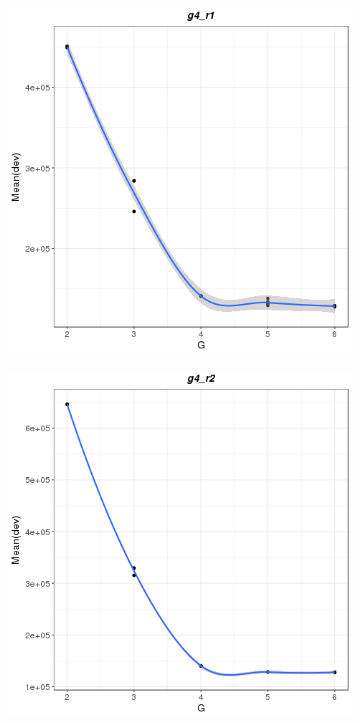 \documentclass{spbau-diploma}
\begin{document}
\begin{figure}
    \hfill
      
   \begin{subfigure}[b]{0.3\textwidth}
        \includegraphics[width=\textwidth]{pics/devs/g4_r1.png}
    \end{subfigure}
    \qquad
    \begin{subfigure}[b]{0.3\textwidth}
        \includegraphics[width=\textwidth]{pics/devs/g4_r2.png}
    \end{subfigure}
      

\end{figure}
\end{document}
